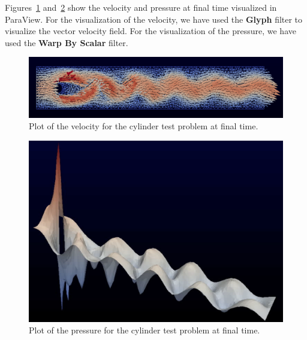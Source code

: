\documentclass[graybox,envcountchap,sectrefs,final]{svmonodo}
\begin{document}
Figures~\ref{ftut1:fig:navier_stokes_cylinder:velocity} and~\ref{ftut1:fig:navier_stokes_cylinder:pressure} show the velocity and
pressure at final time visualized in ParaView. For the visualization
of the velocity, we have used the \textbf{Glyph} filter to visualize the
vector velocity field. For the visualization of the pressure, we have
used the \textbf{Warp By Scalar} filter.


\begin{figure}[!ht]  %
  \centerline{\includegraphics[width=0.95\linewidth]{fig/navier_stokes_cylinder_velocity.png}}
  \caption{
  Plot of the velocity for the cylinder test problem at final time. \label{ftut1:fig:navier_stokes_cylinder:velocity}
  }
\end{figure}



\begin{figure}[!ht]  %
  \centerline{\includegraphics[width=0.95\linewidth]{fig/navier_stokes_cylinder_pressure.png}}
  \caption{
  Plot of the pressure for the cylinder test problem at final time. \label{ftut1:fig:navier_stokes_cylinder:pressure}
  }
\end{figure}
\end{document}
